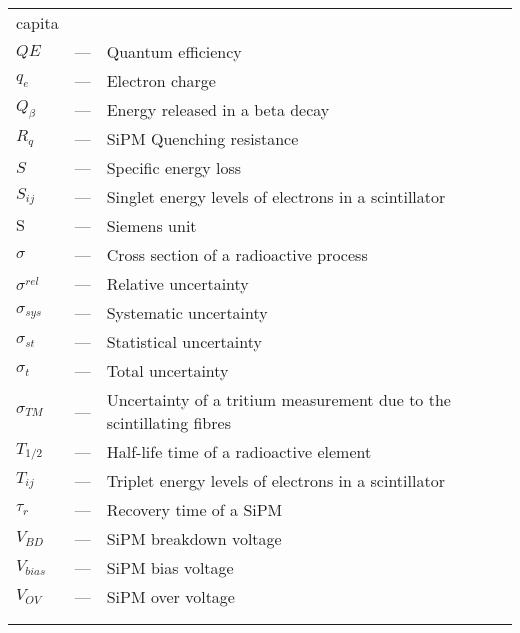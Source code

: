 \begin{longtable}{p{25mm} c p{120mm} }
\newline
capita\\
$QE$ & --- & Quantum efficiency\\
$q_{e}$ & --- & Electron charge\\
$Q_\beta$ & --- & Energy released in a beta decay\\
$R_q$ & --- & SiPM Quenching resistance\\
$S$ & --- & Specific energy loss\\
$S_{ij}$ & --- & Singlet energy levels of electrons in a 
\newline
scintillator\\
$\text{S}$ & --- & Siemens unit\\
$\sigma$ & --- & Cross section of a radioactive process\\
$\sigma^{rel}$ & --- & Relative uncertainty\\
$\sigma_{sys}$ & --- & Systematic uncertainty\\
$\sigma_{st}$ & --- & Statistical uncertainty\\
$\sigma_{t}$ & --- & Total uncertainty\\
$\sigma_{TM}$ & --- & Uncertainty of a tritium measurement
\newline
due to the scintillating fibres\\
$T_{1/2}$ & --- & Half-life time of a radioactive element\\
$T_{ij}$ & --- & Triplet energy levels of electrons in a 
\newline
scintillator\\
$\tau_r$ & --- & Recovery time of a SiPM\\
$V_{BD}$ & --- & SiPM breakdown voltage\\
$V_{bias}$ & --- & SiPM bias voltage\\
$V_{OV}$ & --- & SiPM over voltage\\
\\
\\

\end{longtable}
